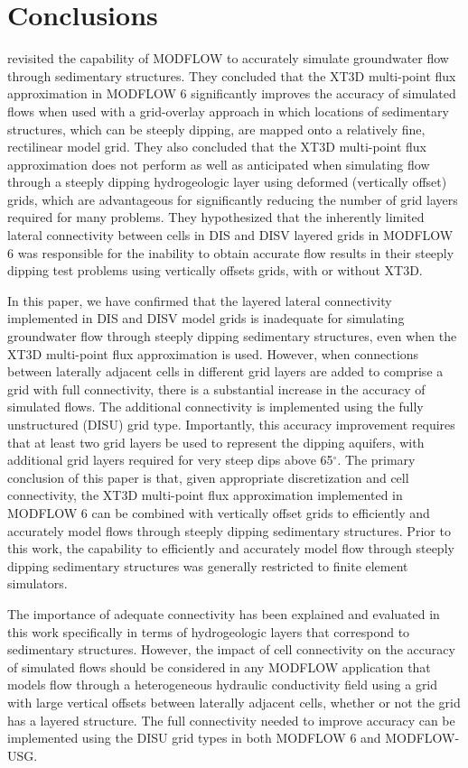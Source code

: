 \documentclass{article}
\begin{document}
\section{Conclusions}

\cite{bardot2022} revisited the capability of MODFLOW to accurately simulate groundwater flow through sedimentary structures.  They concluded that the XT3D multi-point flux approximation in MODFLOW 6 significantly improves the accuracy of simulated flows when used with a grid-overlay approach in which locations of sedimentary structures, which can be steeply dipping, are mapped onto a relatively fine, rectilinear model grid.  They also concluded that the XT3D multi-point flux approximation does not perform as well as anticipated when simulating flow through a steeply dipping hydrogeologic layer using deformed (vertically offset) grids, which are advantageous for significantly reducing the number of grid layers required for many problems.  They hypothesized that the inherently limited lateral connectivity between cells in DIS and DISV layered grids in MODFLOW 6 was responsible for the inability to obtain accurate flow results in their steeply dipping test problems using vertically offsets grids, with or without XT3D.

In this paper, we have confirmed that the layered lateral connectivity implemented in DIS and DISV model grids is inadequate for simulating groundwater flow through steeply dipping sedimentary structures, even when the XT3D multi-point flux approximation is used.  However, when connections between laterally adjacent cells in different grid layers are added to comprise a grid with full connectivity, there is a substantial increase in the accuracy of simulated flows.  The additional connectivity is implemented using the fully unstructured (DISU) grid type.  Importantly, this accuracy improvement requires that at least two grid layers be used to represent the dipping aquifers, with additional grid layers required for very steep dips above 65$^{\circ}$.  The primary conclusion of this paper is that, given appropriate discretization and cell connectivity, the XT3D multi-point flux approximation implemented in MODFLOW 6 can be combined with vertically offset grids to efficiently and accurately model flows through steeply dipping sedimentary structures.  Prior to this work, the capability to efficiently and accurately model flow through steeply dipping sedimentary structures was generally restricted to finite element simulators.

The importance of adequate connectivity has been explained and evaluated in this work specifically in terms of hydrogeologic layers that correspond to sedimentary structures. However, the impact of cell connectivity on the accuracy of simulated flows should be considered in any MODFLOW application that models flow through a heterogeneous hydraulic conductivity field using a grid with large vertical offsets between laterally adjacent cells, whether or not the grid has a layered structure. The full connectivity needed to improve accuracy can be implemented using the DISU grid types in both MODFLOW 6 and MODFLOW-USG.
\end{document}
